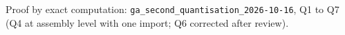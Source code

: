 Proof by exact computation: \texttt{ga\_second\_quantisation\_2026-10-16}, Q1 to Q7 (Q4 at assembly level with one import; Q6 corrected after review).
